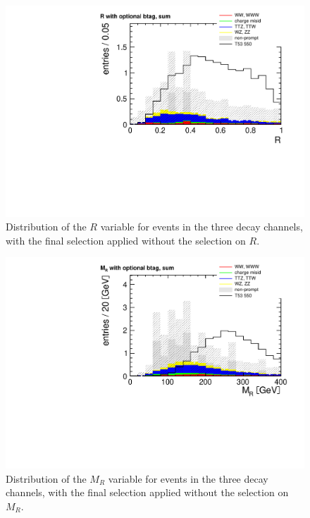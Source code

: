 \begin{figure}[htb]
    \centering
    \includegraphics[width=\textwidth]{images/pdf/4jets_AND_mr200_AND_had_mass350/r_optional_btag_sum_0}
    \caption{Distribution of the $R$ variable for events in the three decay
        channels, with the final
    selection applied without the selection on $R$.}
    \label{fig:nor}
\end{figure}

\begin{figure}[htb]
    \centering
    \includegraphics[width=\textwidth]{images/pdf/4jets_AND_r02_AND_had_mass350/mr_optional_btag_sum_0}
    \caption{Distribution of the $M_R$ variable for events in the three decay
        channels, with the final
    selection applied without the selection on $M_R$.}
    \label{fig:nomr}
\end{figure}

